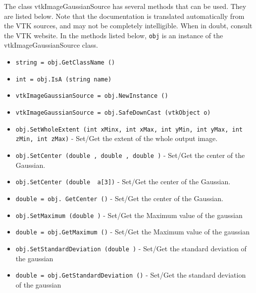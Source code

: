The class vtkImageGaussianSource has several methods that can be used.
  They are listed below.
Note that the documentation is translated automatically from the VTK sources,
and may not be completely intelligible.  When in doubt, consult the VTK website.
In the methods listed below, \verb|obj| is an instance of the vtkImageGaussianSource class.
\begin{itemize}
\item  \verb|string = obj.GetClassName ()|

\item  \verb|int = obj.IsA (string name)|

\item  \verb|vtkImageGaussianSource = obj.NewInstance ()|

\item  \verb|vtkImageGaussianSource = obj.SafeDownCast (vtkObject o)|

\item  \verb|obj.SetWholeExtent (int xMinx, int xMax, int yMin, int yMax, int zMin, int zMax)| -  Set/Get the extent of the whole output image.

\item  \verb|obj.SetCenter (double , double , double )| -  Set/Get the center of the Gaussian.

\item  \verb|obj.SetCenter (double  a[3])| -  Set/Get the center of the Gaussian.

\item  \verb|double = obj. GetCenter ()| -  Set/Get the center of the Gaussian.

\item  \verb|obj.SetMaximum (double )| -  Set/Get the Maximum value of the gaussian

\item  \verb|double = obj.GetMaximum ()| -  Set/Get the Maximum value of the gaussian

\item  \verb|obj.SetStandardDeviation (double )| -  Set/Get the standard deviation of the gaussian

\item  \verb|double = obj.GetStandardDeviation ()| -  Set/Get the standard deviation of the gaussian

\end{itemize}

